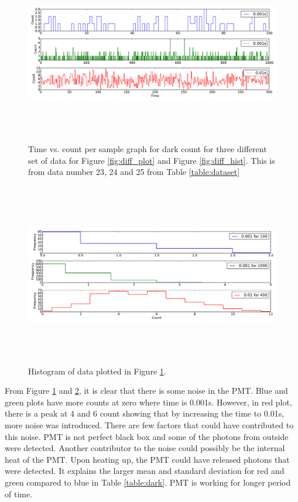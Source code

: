 \documentclass[a4paper,12pt]{article}
\begin{document}
\begin{figure}[H]
\centering
\includegraphics[angle=0,height=8cm,width=15.5cm]{graphs/dark_plots.pdf}
\caption{Time vs. count per sample graph for dark count  for three different set of data for Figure \ref{fig:diff_plot} and Figure \ref{fig:diff_hist}. This is from data number 23, 24 and 25 from Table \ref{table:dataset}}
\label{fig:dark_plot}
\end{figure}

\begin{figure}[H]
\centering
\includegraphics[angle=0,height=8cm,width=15.5cm]{graphs/dark_hist.pdf}
\caption{Histogram of data plotted in Figure \ref{fig:dark_plot}.}
\label{fig:dark_hist}
\end{figure}


From Figure \ref{fig:dark_plot} and \ref{fig:dark_hist}, it is clear that there is some noise in the PMT. Blue and green plots have more counts at zero where time is 0.001s. However, in red plot, there is a peak at 4 and 6 count showing that by increasing the time to 0.01s, more noise was introduced. There are few factors that could have contributed to this noise. PMT is not perfect black box and some of the photons from outside were detected. Another contributor to the noise could possibly be the internal heat of the PMT. Upon heating up, the PMT could have released photons that were detected. It explains the larger mean and standard deviation for red and green compared to blue in Table \ref{table:dark}. PMT is working for longer period of time. 
\end{document}
